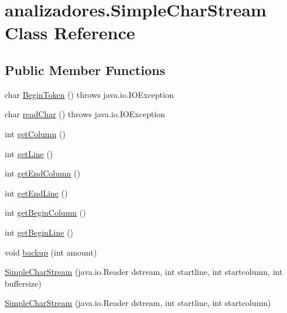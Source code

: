 \hypertarget{classanalizadores_1_1_simple_char_stream}{}\section{analizadores.\+Simple\+Char\+Stream Class Reference}
\label{classanalizadores_1_1_simple_char_stream}
\subsection*{Public Member Functions}
\begin{DoxyCompactItemize}
\item 
char \mbox{\hyperlink{classanalizadores_1_1_simple_char_stream_a5b71e22435880e75608126903932096b}{Begin\+Token}} ()  throws java.\+io.\+I\+O\+Exception   
\item 
char \mbox{\hyperlink{classanalizadores_1_1_simple_char_stream_a9464412a320a813e875a461e6b0bb2af}{read\+Char}} ()  throws java.\+io.\+I\+O\+Exception   
\item 
int \mbox{\hyperlink{classanalizadores_1_1_simple_char_stream_ad9fd1239a7ecd61c0106e6863d8f81cd}{get\+Column}} ()
\item 
int \mbox{\hyperlink{classanalizadores_1_1_simple_char_stream_ad2af5c3f4fadce0ec36b08eb5bc67b42}{get\+Line}} ()
\item 
int \mbox{\hyperlink{classanalizadores_1_1_simple_char_stream_a3ab1da641448601061ce9a7ebea34708}{get\+End\+Column}} ()
\item 
int \mbox{\hyperlink{classanalizadores_1_1_simple_char_stream_a3fdfd0491baacd797c687589159c7a98}{get\+End\+Line}} ()
\item 
int \mbox{\hyperlink{classanalizadores_1_1_simple_char_stream_af5e3275258c76e84e09cde45971d2c6f}{get\+Begin\+Column}} ()
\item 
int \mbox{\hyperlink{classanalizadores_1_1_simple_char_stream_a161f2eda40737765b89e9d0c28decadf}{get\+Begin\+Line}} ()
\item 
void \mbox{\hyperlink{classanalizadores_1_1_simple_char_stream_a63dfe525e3f73ea9277581d0e8853d1a}{backup}} (int amount)
\item 
\mbox{\hyperlink{classanalizadores_1_1_simple_char_stream_a6debcff3bab58fc04e50fea277eddda6}{Simple\+Char\+Stream}} (java.\+io.\+Reader dstream, int startline, int startcolumn, int buffersize)
\item 
\mbox{\hyperlink{classanalizadores_1_1_simple_char_stream_abd26499c5e2b7106edb3ce04085f5603}{Simple\+Char\+Stream}} (java.\+io.\+Reader dstream, int startline, int startcolumn)

\end{DoxyCompactItemize}
